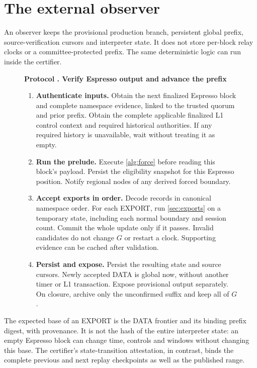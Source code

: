 \documentclass[11pt,a4paper]{article}
\newcounter{protocol}
\newenvironment{protocol}[2]{\begin{figure}[htbp]\refstepcounter{protocol}\label{#1}
\begin{mdframed}[linewidth=.6pt,skipabove=0pt,skipbelow=0pt,
innertopmargin=7pt,innerbottommargin=7pt]\small
\textbf{Protocol \theprotocol. #2}\par\smallskip}{\end{mdframed}\end{figure}}
\begin{document}
\section{The external observer}
\label{sec:observers}
An observer keeps the provisional production branch, persistent global
prefix, source-verification cursors and interpreter state. It does not
store per-block relay clocks or a committee-protected prefix.
The same deterministic logic can run inside the certifier.

\begin{protocol}{alg:external}{Verify Espresso output and advance the prefix}
\begin{enumerate}[label=\textbf{\arabic*)},itemsep=3pt]
\item \textbf{Authenticate inputs.} Obtain the next finalized
Espresso block and complete namespace evidence, linked to the trusted
quorum and prior prefix. Obtain the complete applicable finalized L1
control context and required historical authorities. If any required
history is unavailable, wait without treating it as empty.

\item \textbf{Run the prelude.} Execute \cref{alg:force} before
reading this block's payload. Persist the eligibility snapshot for this
Espresso position. Notify regional nodes of any derived forced boundary.

\item \textbf{Accept exports in order.} Decode records in canonical
namespace order. For each EXPORT, run \cref{sec:exports} on a temporary
state, including each normal boundary and session count. Commit the
whole update only if it passes. Invalid candidates do not change $G$
or restart a clock. Supporting evidence can be cached after validation.

\item \textbf{Persist and expose.} Persist the resulting state and
source cursors. Newly accepted DATA is global now, without another
timer or L1 transaction. Expose provisional output separately.
On closure, archive only the unconfirmed suffix and keep all of $G$.
\end{enumerate}
\end{protocol}

The expected base of an EXPORT is the DATA frontier and its binding
prefix digest, with provenance. It is not the hash of the entire
interpreter state: an empty Espresso block can change time, controls
and windows without changing this base. The certifier's state-transition
attestation, in contrast, binds the complete previous and next replay
checkpoints as well as the published range.
\end{document}
